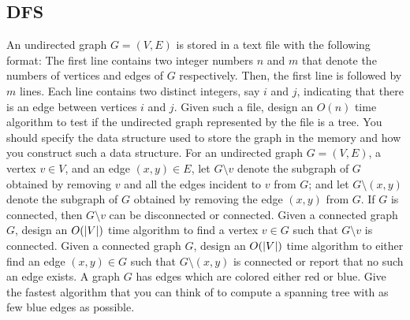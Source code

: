 \subsection{DFS}
\begin{Exercise}

\Question An undirected graph $G = (V, E)$ is stored in a text file with the following format: The first line contains two integer numbers $n$ and $m$ that denote the numbers of vertices and edges of $G$ respectively. Then, the first line is followed by $m$ lines. Each line contains two distinct integers, say $i$ and $j$, indicating that there is an edge between vertices $i$ and $j$. Given such a file, design an $O(n)$ time algorithm to test if the undirected graph represented by the file is a tree. You should specify the data structure used to store the graph in the memory and how you construct such a data structure.   \label{dfs:1}
\Question For an undirected graph $G = (V, E)$, a vertex $v \in V$, and an edge $(x, y) \in E$, let $G\setminus v$ denote the subgraph of $G$ obtained by removing $v$ and all the edges incident to $v$ from $G$; and let $G\setminus(x, y)$ denote the subgraph of $G$ obtained by removing the edge $(x, y)$ from $G$. If $G$ is connected, then $G\setminus v$ can be disconnected or connected. \label{dfs:2}
\subQuestion Given a connected graph $G$, design an $O(\lvert V\rvert)$ time algorithm to find a vertex $v \in G$ such that $G\setminus v$ is connected. \label{dfs:21}
\subQuestion Given a connected graph $G$, design an $O(\lvert V\rvert)$ time algorithm to either find an edge $(x, y) \in G$ such that $G\setminus (x, y)$  is connected or report that no such an edge exists.  \label{dfs:22}
\Question A graph $G$ has edges which are colored either red or blue. Give the fastest algorithm that you can think of to compute a spanning tree with as few blue edges as possible. \school{[NCTU CS 106]} \label{dfs:3}
\end{Exercise}
